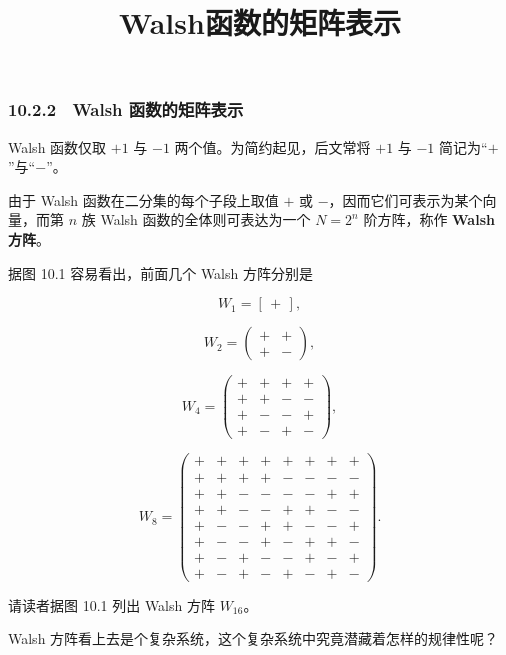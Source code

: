\documentclass[
  10pt,
  fontset=fandol]{ctexart}
\title{Walsh函数的矩阵表示}
\author{}
\date{}
\begin{document}
\maketitle

\subsubsection{10.2.2　Walsh 函数的矩阵表示}\label{walsh-ux51fdux6570ux7684ux77e9ux9635ux8868ux793a}

Walsh 函数仅取 \(+1\) 与 \(-1\) 两个值。为简约起见，后文常将 \(+1\) 与 \(-1\) 简记为``\(+\)''与``\(-\)''。

由于 Walsh 函数在二分集的每个子段上取值 \(+\) 或 \(-\)，因而它们可表示为某个向量，而第 \(n\) 族 Walsh 函数的全体则可表达为一个 \(N=2^n\) 阶方阵，称作 \textbf{Walsh 方阵}。

据图 10.1 容易看出，前面几个 Walsh 方阵分别是

\[
W_1=[\,+\,],
\]

\[
W_2=\begin{pmatrix}+&+\\+&-\end{pmatrix},
\]

\[
W_4=\begin{pmatrix}
+&+&+&+\\
+&+&-&-\\
+&-&-&+\\
+&-&+&-
\end{pmatrix},
\]

\[
W_8=\begin{pmatrix}
+&+&+&+&+&+&+&+\\
+&+&+&+&-&-&-&-\\
+&+&-&-&-&-&+&+\\
+&+&-&-&+&+&-&-\\
+&-&-&+&+&-&-&+\\
+&-&-&+&-&+&+&-\\
+&-&+&-&-&+&-&+\\
+&-&+&-&+&-&+&-
\end{pmatrix}.
\]

请读者据图 10.1 列出 Walsh 方阵 \(W_{16}\)。

Walsh 方阵看上去是个复杂系统，这个复杂系统中究竟潜藏着怎样的规律性呢？
\end{document}

